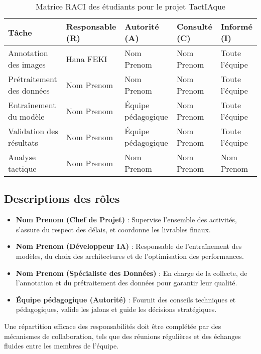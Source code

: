\begin{table}
\centering
\renewcommand{\arraystretch}{1.5}
\setlength{\tabcolsep}{5pt}
\begin{tabular}{|p{4cm}|p{3cm}|p{3cm}|p{3cm}|p{3cm}|}
    \hline
    \textbf{Tâche} & \textbf{Responsable (R)} & \textbf{Autorité (A)} & \textbf{Consulté (C)} & \textbf{Informé (I)} \\
    \hline
    Annotation des images & Hana FEKI & Nom Prenom & Nom Prenom & Toute l'équipe \\
    \hline
    Prétraitement des données & Nom Prenom & Nom Prenom & Nom Prenom & Toute l'équipe \\
    \hline
    Entraînement du modèle & Nom Prenom & Équipe pédagogique & Nom Prenom & Toute l'équipe \\
    \hline
    Validation des résultats & Nom Prenom & Équipe pédagogique & Nom Prenom & Toute l'équipe \\
    \hline
    Analyse tactique & Nom Prenom & Nom Prenom & Nom Prenom & Nom Prenom  \\
    \hline
\end{tabular}
\caption{Matrice RACI des étudiants pour le projet TactIAque}
\label{tab:RACI}
\end{table}

\subsection{Descriptions des rôles}
\begin{itemize}
    \item \textbf{Nom Prenom (Chef de Projet)} : Supervise l'ensemble des activités, s'assure du respect des délais, et coordonne les livrables finaux.
    \item \textbf{Nom Prenom (Développeur IA)} : Responsable de l'entraînement des modèles, du choix des architectures et de l'optimisation des performances.
    \item \textbf{Nom Prenom (Spécialiste des Données)} : En charge de la collecte, de l'annotation et du prétraitement des données pour garantir leur qualité.
    \item \textbf{Équipe pédagogique (Autorité)} : Fournit des conseils techniques et pédagogiques, valide les jalons et guide les décisions stratégiques.
\end{itemize}
Une répartition efficace des responsabilités doit être complétée par des mécanismes de collaboration, tels que des réunions régulières et des échanges fluides entre les membres de l'équipe.
